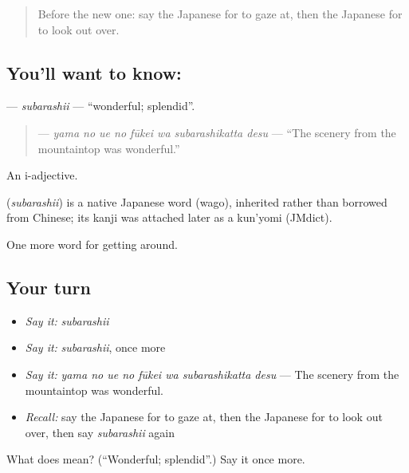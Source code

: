 \label{lesson:JA-C404-subarashii}



\begin{quote}
Before the new one: say the Japanese for to gaze at, then the Japanese for to look out over.
\end{quote}

\subsection*{You'll want to know: }
\textbf{} — \emph{subarashii} — \textquotedblleft{}wonderful; splendid\textquotedblright{}.

\begin{quote}
\textbf{   } — \emph{yama no ue no fūkei wa subarashikatta desu} — \textquotedblleft{}The scenery from the mountaintop was wonderful.\textquotedblright{}
\end{quote}

An i-adjective.

\begin{cousinweb}
\textbf{} (\emph{subarashii}) is a native Japanese word (wago), inherited rather than borrowed from Chinese; its kanji was attached later as a kun'yomi (JMdict).
\end{cousinweb}

\begin{grammarlens}[title={What you've built}]
One more word for getting around.
\end{grammarlens}

\subsection*{Your turn}
\begin{itemize}
\raggedright
  \item \emph{Say it:} \emph{subarashii}
  \item \emph{Say it:} \emph{subarashii}, once more
  \item \emph{Say it:} \emph{yama no ue no fūkei wa subarashikatta desu} — The scenery from the mountaintop was wonderful.
  \item \emph{Recall:} say the Japanese for to gaze at, then the Japanese for to look out over, then say \emph{subarashii} again
\end{itemize}

\begin{tcolorbox}[breakable,colback=teal!4,colframe=teal!35!black,title={Before you move on}]
What does  mean? (\textquotedblleft{}Wonderful; splendid\textquotedblright{}.) Say it once more.
\end{tcolorbox}
